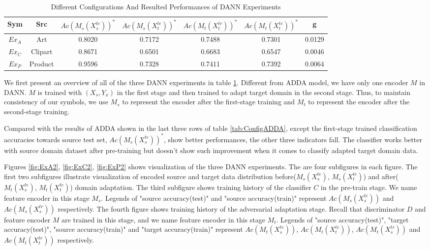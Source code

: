 \documentclass[conference]{IEEEtran}
\begin{document}
 \begin{table}[h]
	\centering
	\caption{Different Configurations And Resulted Performances of DANN Experiments}
	\label{tab:ConfigDANN}
	\begin{tabular}{ccccccc}
		\hline
		Sym & Src & $Ac(M_s(X^{te}_s))^*$ & $Ac(M_s(X^{te}_t))^*$ & $Ac(M_t(X^{tr}_t))^*$ & $Ac(M_t(X^{te}_t))^*$ & g\\
		\hline
		\hline
		$Ex_A$ &  Art & 0.8020 & 0.7172 & 0.7488 & 0.7301 & 0.0129\\
		$Ex_C$ &  Clipart & 0.8671 & 0.6501 & 0.6683 & 0.6547 & 0.0046\\
		$Ex_P$ &  Product &  0.9596 & 0.7328 & 0.7411 & 0.7392 & 0.0064\\
		\hline
	\end{tabular}
\end{table}
We first present an overview of all of the three DANN experiments in table \ref{tab:ConfigDANN}. Different from ADDA model, we have only one encoder $M$ in DANN. $M$ is trained with $(X_s, Y_x)$ in the first stage and then trained to adapt target domain in the second stage. Thus, to maintain consistency of our symbols, we use $M_s$ to represent the encoder after the first-stage training and $M_t$ to represent the encoder after the second-stage training.

Compared with the results of ADDA shown in the last three rows of table \ref{tab:ConfigADDA}, except the first-stage trained classification accuracies towards source test set, $Ac(M_s(X^{te}_s))^*$, show better performances, the other three indicators fall. The classifier works better with source domain dataset after pre-training but doesn't show such improvement when it comes to classify adapted target domain data.

Figures \ref{fig:ExA2}, \ref{fig:ExC2}, \ref{fig:ExP2} shows visualization of the three DANN experiments. The are four subfigures in each figure. The first two subfigures illustrate visualization of encoded source and target data distribution before($M_s(X^{te}_s)$, $M_s(X^{te}_t)$) and after($M_t(X^{te}_s)$, $M_t(X^{te}_t)$) domain adaptation. The third subfigure shows training history of the classifier $C$ in the pre-train stage. We name feature encoder in this stage $M_s$. Legends of "source accuracy(test)" and "source accuracy(train)" represent $Ac(M_s(X^{te}_s))$ and $Ac(M_s(X^{tr}_s))$ respectively. The fourth figure shows training history of the adversarial adaptation stage. Recall that discriminator $D$ and feature encoder $M$ are trained in this stage, and we name feature encoder in this stage $M_t$.  Legends of "source accuracy(test)", "target accuracy(test)", "source accuracy(train)" and "target accuracy(train)" represent $Ac(M_t(X^{te}_s))$, $Ac(M_t(X^{te}_t))$, $Ac(M_t(X^{tr}_s))$ and $Ac(M_t(X^{tr}_t))$ respectively.
\end{document}
